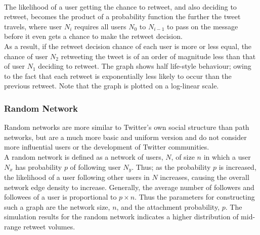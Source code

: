 \\
The likelihood of a user getting the chance to retweet, and also deciding to retweet, becomes the product of a probability function the further the tweet travels, where user $ N_i $ requires all users $ N_0 $ to $ N_{i-1} $ to pass on the message before it even gets a chance to make the retweet decision.
\\
As a result, if the retweet decision chance of each user is more or less equal, the chance of user $ N_2  $ retweeting the tweet is of an order of magnitude less than that of user $ N_1 $ deciding to retweet. The graph shows half life-style behaviour; owing to the fact that each retweet is exponentially less likely to occur than the previous retweet. Note that the graph is plotted on a log-linear scale.

\subsubsection{Random Network}
Random networks are more similar to Twitter's own social structure than path networks, but are a much more basic and uniform version and do not consider more influential users or the development of Twitter communities.
\\
A random network is defined as a network of users, $ N $, of size $ n $ in which a user $ N_x $ has probability $ p $ of following user $ N_y $. Thus; as the probability $ p $ is increased, the likelihood of a user following other users in $ N $ increases, causing the overall network edge density to increase. Generally, the average number of followers and followees of a user is proportional to $ p\times n $. Thus the parameters for constructing such a graph are the network size, $n$, and the attachment probability, $p$. The simulation results for the random network indicates a higher distribution of mid-range retweet volumes.
\begin{figure}[h]
\end{figure}

